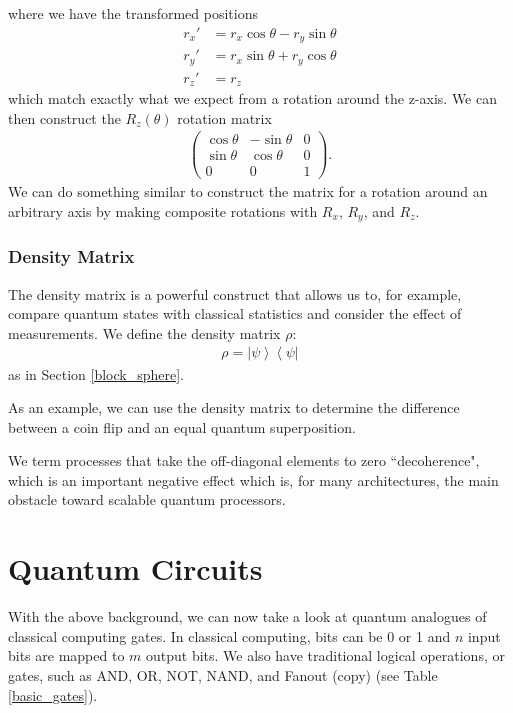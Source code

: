 \documentclass[11pt]{article} %
\newcommand{\bra}[1]{\left\langle #1 \right|}
\newcommand{\ket}[1]{\left|#1\right\rangle}
\begin{document}
where we have the transformed positions
\begin{align}
    r_x' &= r_x\cos\theta-r_y\sin\theta\nonumber\\
    r_y' &= r_x\sin\theta+r_y\cos\theta\nonumber\\
    r_z' &= r_z
\end{align}
which match exactly what we expect from a rotation around the z-axis. We can then construct the $R_z(\theta)$ rotation matrix
\begin{align}
    \begin{pmatrix}
        \cos\theta & -\sin\theta & 0\\
        \sin\theta & \cos\theta & 0\\
        0 & 0 & 1
    \end{pmatrix}.
\end{align}
We can do something similar to construct the matrix for a rotation around an arbitrary axis by making composite rotations with $R_x$, $R_y$, and $R_z$.

\subsubsection{Density Matrix}
The density matrix is a powerful construct that allows us to, for example, compare quantum states with classical statistics and consider the effect of measurements. We define the density matrix $\rho$:
\begin{align}
    \rho = \ket{\psi}\bra{\psi}
\end{align}
as in Section \ref{block_sphere}.

As an example, we can use the density matrix to determine the difference between a coin flip and an equal quantum superposition.

We term processes that take the off-diagonal elements to zero ``decoherence", which is an important negative effect which is, for many architectures, the main obstacle toward scalable quantum processors.

\section{Quantum Circuits}
With the above background, we can now take a look at quantum analogues of classical computing gates. In classical computing, bits can be 0 or 1 and $n$ input bits are mapped to $m$ output bits. We also have traditional logical operations, or gates, such as AND, OR, NOT, NAND, and Fanout (copy) (see Table \ref{basic_gates}).
\end{document}
